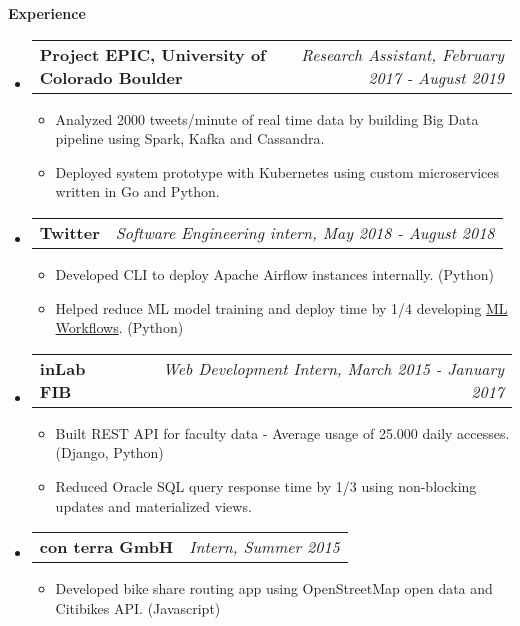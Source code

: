 \documentclass[letterpaper,10pt]{article}
\makeatletter
\newcommand{\resitem}[1]{\item #1 \vspace{-2pt}}
\newcommand{\resheading}[1]{{\large \colorbox{mygrey}{\begin{minipage}{\textwidth}{\textbf{#1 \vphantom{p\^{E}}}}\end{minipage}}}}
\newcommand{\ressubheading}[4]{
\begin{tabular*}{7.0in}{l@{\extracolsep{\fill}}r}
		\textbf{#1} & \textit{#4} \\
\end{tabular*}\vspace{-6pt}}
\makeatother
\begin{document}
\resheading{Experience}
	\begin{itemize}
		\item
			\ressubheading{Project EPIC, University of Colorado Boulder}{Boulder, CO}{Research Assistant}{Research Assistant, February 2017 - August 2019}
			\begin{itemize}
				\resitem{Analyzed 2000 tweets/minute of real time data by building Big Data pipeline using Spark, Kafka and Cassandra.} 
				\resitem{Deployed system prototype with Kubernetes using custom microservices written in Go and Python.}
			\end{itemize}
			\item
			\ressubheading{Twitter}{Boulder, CO}{Software Engineering intern}{Software Engineering intern, May 2018 - August 2018}
			\begin{itemize}
				\resitem{Developed CLI to deploy Apache Airflow instances internally. (Python)}
				\resitem{Helped reduce ML model training and deploy time by 1/4 developing \href{https://blog.twitter.com/engineering/en_us/topics/insights/2018/ml-workflows.html}{ML Workflows}. (Python)}
			\end{itemize}
		\item
			\ressubheading{inLab FIB}{Barcelona, Spain}{Web Development Intern}{Web Development Intern, March 2015 - January 2017}
			\begin{itemize}
				\resitem{Built REST API for faculty data - Average usage of 25.000 daily accesses. (Django, Python)}
				\resitem{Reduced Oracle SQL query response time by 1/3 using non-blocking updates and materialized views.}
			\end{itemize}

		\item
			\ressubheading{con terra GmbH}{Münster, Germany}{Intern}{Intern, Summer 2015}
			\begin{itemize}
				\resitem{Developed bike share routing app using OpenStreetMap open data and Citibikes API. (Javascript)}
			\end{itemize}
	\end{itemize}
\end{document}
